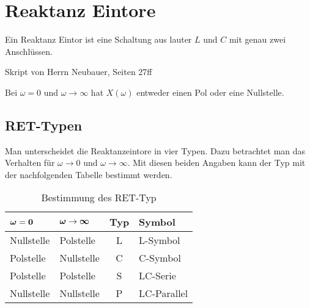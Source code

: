 \section{Reaktanz Eintore}
Ein Reaktanz Eintor ist eine Schaltung aus lauter $L$ und $C$ mit genau zwei
Anschlüssen.

Skript von Herrn Neubauer, Seiten 27ff

Bei $\omega = 0$ und $\omega \rightarrow \infty$ hat $X(\omega)$ entweder einen
Pol oder eine Nullstelle.


\subsection{RET-Typen}
Man unterscheidet die Reaktanzeintore in vier Typen. Dazu betrachtet man das
Verhalten für $\omega \rightarrow 0$ und $\omega \rightarrow \infty$. Mit diesen
beiden Angaben kann der Typ mit der nachfolgenden Tabelle bestimmt werden.

\begin{table}[!h]
\begin{center}
\begin{tabular}{|l|l|c|l|}
  \hline
  $\bf \boldsymbol\omega = 0$ & $\bf \boldsymbol\omega \rightarrow
  \boldsymbol\infty$ & \textbf{Typ} & \textbf{Symbol} \\
  \hline
  Nullstelle & Polstelle  & L & L-Symbol \\
  \hline
  Polstelle  & Nullstelle & C & C-Symbol \\
  \hline
  Polstelle  & Polstelle  & S & LC-Serie \\
  \hline
  Nullstelle & Nullstelle & P & LC-Parallel \\
  \hline
\end{tabular}
\caption{Bestimmung des RET-Typ}
\label{tab:RETTypBestimmung}
\end{center}
\end{table}

